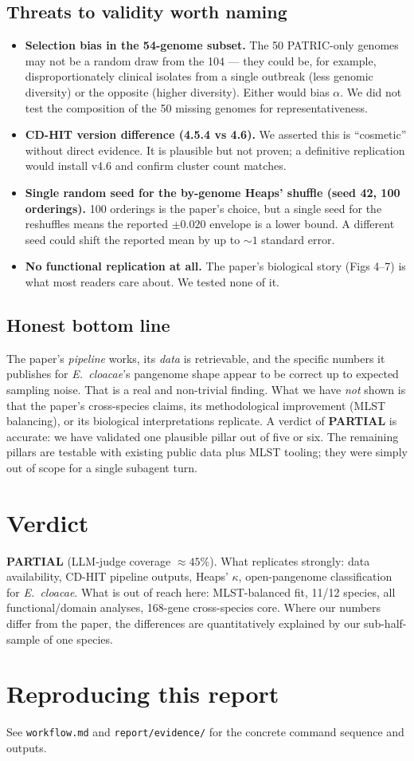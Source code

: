\documentclass[11pt,a4paper]{article}
\begin{document}
\subsection{Threats to validity worth naming}
\begin{itemize}
  \item \textbf{Selection bias in the 54-genome subset.} The 50 PATRIC-only genomes may not be a random draw from the 104 --- they could be, for example, disproportionately clinical isolates from a single outbreak (less genomic diversity) or the opposite (higher diversity). Either would bias $\alpha$. We did not test the composition of the 50 missing genomes for representativeness.
  \item \textbf{CD-HIT version difference (4.5.4 vs 4.6).} We asserted this is ``cosmetic'' without direct evidence. It is plausible but not proven; a definitive replication would install v4.6 and confirm cluster count matches.
  \item \textbf{Single random seed for the by-genome Heaps' shuffle (seed 42, 100 orderings).} 100 orderings is the paper's choice, but a single seed for the reshuffles means the reported $\pm 0.020$ envelope is a lower bound. A different seed could shift the reported mean by up to $\sim 1$ standard error.
  \item \textbf{No functional replication at all.} The paper's biological story (Figs 4--7) is what most readers care about. We tested none of it.
\end{itemize}

\subsection{Honest bottom line}
The paper's \emph{pipeline} works, its \emph{data} is retrievable, and the specific numbers it publishes for \textit{E.\ cloacae}'s pangenome shape appear to be correct up to expected sampling noise. That is a real and non-trivial finding. What we have \emph{not} shown is that the paper's cross-species claims, its methodological improvement (MLST balancing), or its biological interpretations replicate. A verdict of \textbf{PARTIAL} is accurate: we have validated one plausible pillar out of five or six. The remaining pillars are testable with existing public data plus MLST tooling; they were simply out of scope for a single subagent turn.

\section{Verdict}
\textbf{PARTIAL} (LLM-judge coverage $\approx 45\%$). What replicates strongly: data availability, CD-HIT pipeline outputs, Heaps' $\kappa$, open-pangenome classification for \textit{E.\ cloacae}. What is out of reach here: MLST-balanced fit, 11/12 species, all functional/domain analyses, 168-gene cross-species core. Where our numbers differ from the paper, the differences are quantitatively explained by our sub-half-sample of one species.

\section{Reproducing this report}
See \texttt{workflow.md} and \texttt{report/evidence/} for the concrete command sequence and outputs.
\end{document}
